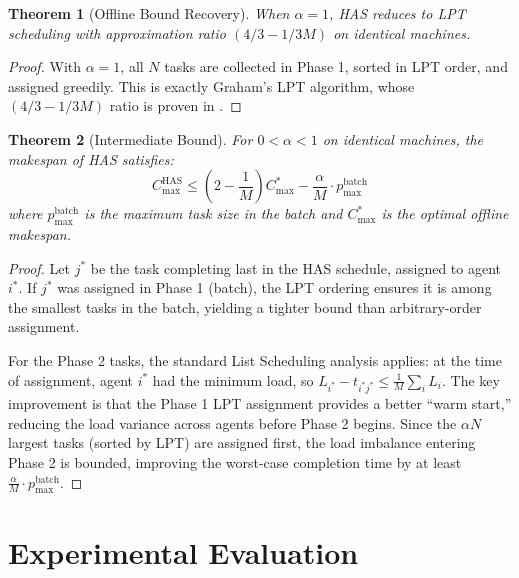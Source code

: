 \documentclass[conference]{IEEEtran}
\newtheorem{theorem}{Theorem}
\begin{document}
\begin{theorem}[Offline Bound Recovery]
When $\alpha = 1$, HAS reduces to LPT scheduling with approximation ratio $(4/3 - 1/3M)$ on identical machines.
\end{theorem}

\begin{proof}
With $\alpha = 1$, all $N$ tasks are collected in Phase 1, sorted in LPT order, and assigned greedily. This is exactly Graham's LPT algorithm, whose $(4/3 - 1/3M)$ ratio is proven in \cite{graham1969}.
\end{proof}

\begin{theorem}[Intermediate Bound]
\label{thm:intermediate}
For $0 < \alpha < 1$ on identical machines, the makespan of HAS satisfies:
\begin{equation}
    C_{\max}^{\text{HAS}} \leq \left(2 - \frac{1}{M}\right) C_{\max}^* - \frac{\alpha}{M} \cdot p_{\max}^{\text{batch}}
\end{equation}
where $p_{\max}^{\text{batch}}$ is the maximum task size in the batch and $C_{\max}^*$ is the optimal offline makespan.
\end{theorem}

\begin{proof}
Let $j^*$ be the task completing last in the HAS schedule, assigned to agent $i^*$. If $j^*$ was assigned in Phase 1 (batch), the LPT ordering ensures it is among the smallest tasks in the batch, yielding a tighter bound than arbitrary-order assignment.

For the Phase 2 tasks, the standard List Scheduling analysis applies: at the time of assignment, agent $i^*$ had the minimum load, so $L_{i^*} - t_{i^*j^*} \leq \frac{1}{M} \sum_{i} L_i$. The key improvement is that the Phase 1 LPT assignment provides a better ``warm start,'' reducing the load variance across agents before Phase 2 begins. Since the $\alpha N$ largest tasks (sorted by LPT) are assigned first, the load imbalance entering Phase 2 is bounded, improving the worst-case completion time by at least $\frac{\alpha}{M} \cdot p_{\max}^{\text{batch}}$.
\end{proof}

\section{Experimental Evaluation}
\end{document}

